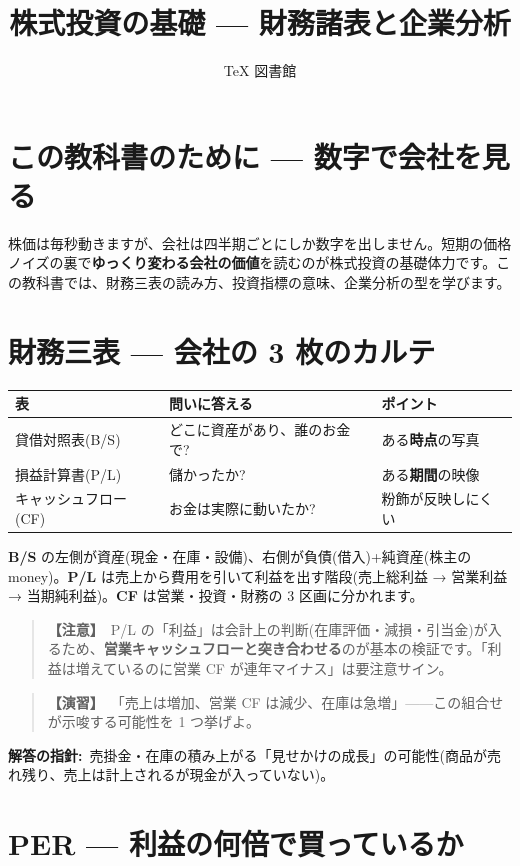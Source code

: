 \documentclass{article}
\title{株式投資の基礎 — 財務諸表と企業分析}
\author{TeX 図書館}
\begin{document}
\section{この教科書のために — 数字で会社を見る}

株価は毎秒動きますが、会社は四半期ごとにしか数字を出しません。短期の価格ノイズの裏で\textbf{ゆっくり変わる会社の価値}を読むのが株式投資の基礎体力です。この教科書では、財務三表の読み方、投資指標の意味、企業分析の型を学びます。

\section{財務三表 — 会社の 3 枚のカルテ}

\begin{center}
\begin{tabular}{|l|l|l|}
\hline
表 & 問いに答える & ポイント \\
\hline
貸借対照表(B/S) & どこに資産があり、誰のお金で? & ある\textbf{時点}の写真 \\
損益計算書(P/L) & 儲かったか? & ある\textbf{期間}の映像 \\
キャッシュフロー(CF) & お金は実際に動いたか? & 粉飾が反映しにくい \\
\hline
\end{tabular}
\end{center}

\textbf{B/S} の左側が資産(現金・在庫・設備)、右側が負債(借入)+純資産(株主の money)。\textbf{P/L} は売上から費用を引いて利益を出す階段(売上総利益 → 営業利益 → 当期純利益)。\textbf{CF} は営業・投資・財務の 3 区画に分かれます。

\begin{quote}
\textbf{【注意】}\ P/L の「利益」は会計上の判断(在庫評価・減損・引当金)が入るため、\textbf{営業キャッシュフローと突き合わせる}のが基本の検証です。「利益は増えているのに営業 CF が連年マイナス」は要注意サイン。
\end{quote}

\begin{quote}
\textbf{【演習】}\ 「売上は増加、営業 CF は減少、在庫は急増」——この組合せが示唆する可能性を 1 つ挙げよ。
\end{quote}

\textbf{解答の指針:}\ 売掛金・在庫の積み上がる「見せかけの成長」の可能性(商品が売れ残り、売上は計上されるが現金が入っていない)。

\section{PER — 利益の何倍で買っているか}
\end{document}
